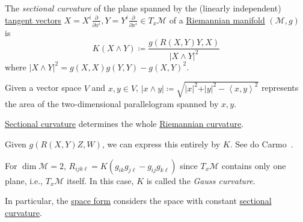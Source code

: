 \begin{definition}\label{def:sectional-curvature}
	The \emph{sectional curvature} of the plane spanned by the (linearly independent) \hyperref[def:tangent-vector]{tangent vectors} \(X = X^i \frac{\partial }{\partial x^i} , Y= Y^i \frac{\partial }{\partial x^i} \in T_x \mathcal{M} \) of a \hyperref[def:Riemannian-manifold]{Riemannian manifold} \((\mathcal{M}, g)\) is
	\[
		K(X \wedge Y) \coloneqq \frac{g(R(X, Y) Y, X)}{\vert X\wedge Y \vert^2 }
	\]
	where \(\vert X \wedge Y \vert ^2 = g(X, X) g(Y, Y) - g(X, Y)^2\).
\end{definition}

\begin{intuition}
	Given a vector space \(V\) and \(x, y\in V\), \(\vert x \wedge y \vert \coloneqq \sqrt{\vert x \vert ^2 + \vert y \vert ^{2} - \left\langle x, y \right\rangle ^2} \) represents the area of the two-dimensional parallelogram spanned by \(x, y\).
\end{intuition}

\begin{remark}
	\hyperref[def:sectional-curvature]{Sectional curvature} determines the whole \hyperref[def:Riemannian-curvature]{Riemannian curvature}.
\end{remark}
\begin{explanation}
	Given \(g(R(X, Y)Z, W)\), we can express this entirely by \(K\). See do Carmo~\cite[Lemma 3.3]{flaherty2013riemannian}.
\end{explanation}

\begin{remark}\label{rmk:Gauss-curvature}
	For \(\dim \mathcal{M} = 2\), \(R_{ijk\ell} = K(g_{ik} g_{j \ell } - g_{ij} g_{k \ell })\) since \(T_x \mathcal{M} \) contains only one plane, i.e., \(T_x \mathcal{M} \) itself. In this case, \(K\) is called the \emph{Gauss curvature}.
\end{remark}

In particular, the \hyperref[def:space-form]{space form} considers the space with constant \hyperref[def:sectional-curvature]{sectional curvature}.

